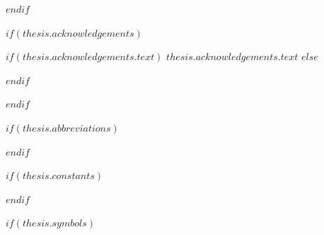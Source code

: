 \begin{abstract}
\addchaptertocentry{\abstractname} %
$abstract$

$if(keywords)$
\vspace{2cm}
\noindent\textbf{Keywords:} $for(keywords)$$keywords$$sep$, $endfor$
$endif$
\end{abstract}

$endif$

$if(thesis.acknowledgements)$

\begin{acknowledgements}
\addchaptertocentry{\acknowledgementname} %
$if(thesis.acknowledgements.text)$
$thesis.acknowledgements.text$
$else$

$endif$
\end{acknowledgements}

$endif$


\begingroup
\hypersetup{linkcolor=$if(toclinkcolor)$$toclinkcolor$$else$black$endif$}

\tableofcontents %

\listoffigures %

\listoftables %

\endgroup


$if(thesis.abbreviations)$

\clearpage


$endif$

$if(thesis.constants)$

\clearpage


$endif$

$if(thesis.symbols)$

